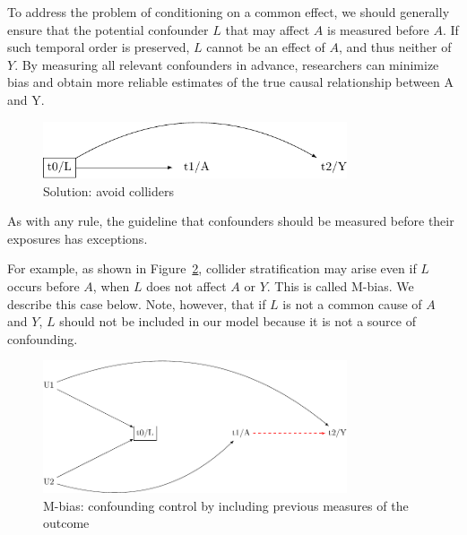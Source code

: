 \documentclass[
  singlecolumn]{report}
\begin{document}
To address the problem of conditioning on a common effect, we should
generally ensure that the potential confounder \(L\) that may affect
\(A\) is measured before \(A\). If such temporal order is preserved,
\(L\) cannot be an effect of \(A\), and thus neither of \(Y\). By
measuring all relevant confounders in advance, researchers can minimize
bias and obtain more reliable estimates of the true causal relationship
between A and Y.

\begin{figure}

{\centering \includegraphics[width=0.8\textwidth,height=\textheight]{causal-dags_files/figure-pdf/fig-dag-common-effect-solution-1.pdf}

}

\caption{\label{fig-dag-common-effect-solution}Solution: avoid
colliders}

\end{figure}

As with any rule, the guideline that confounders should be measured
before their exposures has exceptions.

For example, as shown in Figure~\ref{fig-m-bias}, collider
stratification may arise even if \(L\) occurs before \(A\), when \(L\)
does not affect \(A\) or \(Y\). This is called M-bias. We describe this
case below. Note, however, that if \(L\) is not a common cause of \(A\)
and \(Y\), \(L\) should not be included in our model because it is not a
source of confounding.

\begin{figure}

{\centering \includegraphics[width=0.8\textwidth,height=\textheight]{causal-dags_files/figure-pdf/fig-m-bias-1.pdf}

}

\caption{\label{fig-m-bias}M-bias: confounding control by including
previous measures of the outcome}

\end{figure}
\end{document}
